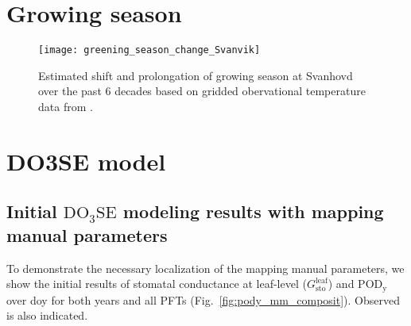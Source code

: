 \documentclass[bg, manuscript]{copernicus}
\begin{document}









\clearpage

\appendix
\section{Growing season}
\label{appendix:growing_season}

\begin{figure*}[th]
  \texttt{[image: greening\_season\_change\_Svanvik]}
  \caption{Estimated shift and prolongation of growing season at Svanhovd over the past 6 decades based on gridded obervational temperature data from \citet{SeNorge}.}
  \label{fig:greening_season_change_Svanvik}
\end{figure*}

\section{DO3SE model}
\label{appendix:do3se_model}

\subsection{Initial $\mathrm{DO_3SE}$ modeling results with mapping manual parameters}
To demonstrate the necessary localization of the mapping manual parameters, we show the initial results of stomatal conductance at leaf-level ($G_\mathrm{sto}^\mathrm{leaf}$) and $\mathrm{POD_y}$ over \unit{doy} for both years and all PFTs (Fig.~\ref{fig:pody_mm_composit}). Observed  is also indicated.
\end{document}
